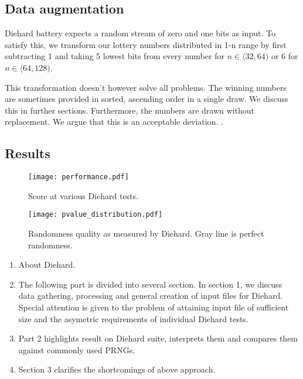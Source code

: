 \subsection{Data augmentation}

Diehard battery expects a random stream of zero and one bits as input. To satisfy this, we transform our lottery numbers distributed in 1-n range by first
subtracting 1 and taking 5 lowest bits from every number for $n \in \langle 32, 64)$ or 6 for $n \in \langle 64, 128)$.

This transformation doesn't however solve all problems. The winning numbers are sometimes provided in sorted, ascending order in a single draw. We discuss
this in further sections. Furthermore, the numbers are drawn without replacement. We argue that this is an acceptable deviation. .

\subsection{Results}

\begin{figure}
    \centering
    \texttt{[image: performance.pdf]}
    \caption{Score at various Diehard tests.}
    \label{fig:performance}
\end{figure}

\begin{figure}
    \centering
    \texttt{[image: pvalue\_distribution.pdf]}
    \caption{Randomness quality as measured by Diehard. Gray line is perfect randomness.}
    \label{fig:pvalue_distribution}
\end{figure}

\begin{enumerate}
    \item About Diehard.
    \item The following part is divided into several section. In section 1, we discuss data gathering, processing and general creation of input files for Diehard. Special
    attention is given to the problem of attaining input file of sufficient size and the asymetric requirements of individual Diehard tests.
    \item Part 2 highlights result on Diehard suite, interprets them and compares them against commonly used PRNGs.
    \item Section 3 clarifies the shortcomings of above approach.
\end{enumerate}
